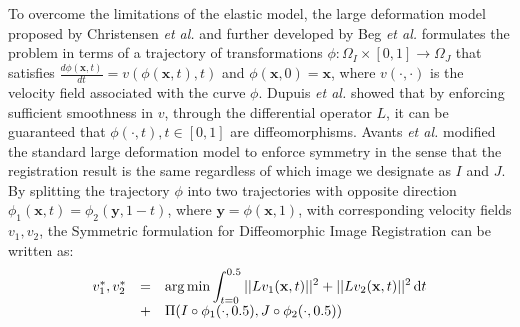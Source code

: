 To overcome the limitations of the elastic model, the large deformation model proposed by Christensen {\it et al.} \cite{Christensen2001} and further developed by Beg {\it et al.} \cite{Science2005} formulates the problem in terms of a trajectory of transformations \hbox{$\phi:\Omega_{I} \times [0, 1] \rightarrow \Omega_{J}$} that satisfies $\frac{d \phi(\mathbf{x}, t)}{dt} = v(\phi(\mathbf{x}, t), t)$ and $\phi(\mathbf{x}, 0) = \mathbf{x}$, where $v(\cdot, \cdot)$ is the velocity field associated with the curve $\phi$. Dupuis {\it et al.} \cite{Dupuis1998} showed that by enforcing sufficient smoothness in $v$, through the differential operator $L$, it can be guaranteed that $\phi(\cdot, t), t \in [0, 1]$ are diffeomorphisms. Avants {\it et al.} \cite{Avants2008, Avants2011} modified the standard large deformation model to enforce symmetry in the sense that the registration result is the same regardless of which image we designate as $I$ and $J$. By splitting the trajectory $\phi$ into two trajectories with opposite direction $\phi_{1}(\mathbf{x}, t) = \phi_{2}(\mathbf{y}, 1-t)$, where $\mathbf{y} = \phi(\mathbf{x}, 1)$, with corresponding velocity fields $v_{1}, v_{2}$, the Symmetric formulation for Diffeomorphic Image Registration \cite{Avants2008, Avants2011} can be written as:
\begin{equation}\label{eq:syn_energy}
    \begin{array}{lll}
        v_{1}^{*}, v_{2}^{*} &=& \mathlarger{\arg \min \int_{t=0}^{0.5} ||L v_{1}(\mathbf{x}, t)||^{2} + ||L v_{2}(\mathbf{x}, t)||^{2} \dif t}\\
        &+& \mathlarger{ \Pi(I \circ \phi_{1}(\cdot, 0.5), J \circ \phi_{2}(\cdot, 0.5))}
    \end{array}
\end{equation}
